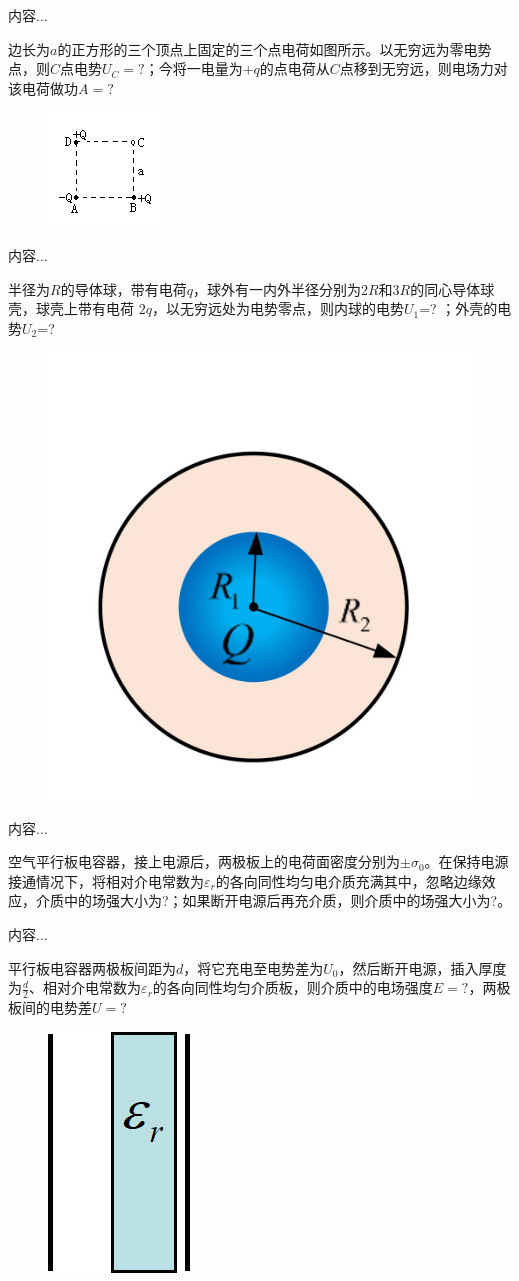 \documentclass[lang=cn,10pt]{elegantbook}
\begin{document}
		\begin{solution}
			内容...
		\end{solution}
		\begin{exercise}
			边长为$a$的正方形的三个顶点上固定的三个点电荷如图所示。以无穷远为零电势点，则$C$点电势$U_{C} =?$；今将一电量为$+q$的点电荷从$C$点移到无穷远，则电场力对该电荷做功$A=?$
\begin{figure}[H]
	\centering
	\includegraphics[width=0.1\linewidth]{image/图片4}
	\caption{}
	\label{fig:4}
\end{figure}
		\end{exercise}
		\begin{solution}
			内容...
		\end{solution}
		\begin{exercise}
			半径为$R$的导体球，带有电荷$q$，球外有一内外半径分别为$2R$和$3R$的同心导体球壳，球壳上带有电荷 $2q$，以无穷远处为电势零点，则内球的电势$U_{1}$=? ；外壳的电势$U_{2}$=?
\begin{figure}[H]
	\centering
	\includegraphics[width=0.1\linewidth]{image/IMG_0418(20231118-125659)}
	\caption{}
	\label{fig:img041820231118-125659}
\end{figure}
		\end{exercise}
		\begin{solution}
			内容...
		\end{solution}
		\begin{exercise}
			空气平行板电容器，接上电源后，两极板上的电荷面密度分别为$\pm \sigma_{0}$。在保持电源接通情况下，将相对介电常数为$\varepsilon_{r}$的各向同性均匀电介质充满其中，忽略边缘效应，介质中的场强大小为?；如果断开电源后再充介质，则介质中的场强大小为?。
		\end{exercise}
		\begin{solution}
			内容...
		\end{solution}
		\begin{exercise}
			平行板电容器两极板间距为$d$，将它充电至电势差为$U_{0}$，然后断开电源，插入厚度为$\frac{d}{2}$、相对介电常数为$\varepsilon_{r}$的各向同性均匀介质板，则介质中的电场强度$E =?$，两极板间的电势差$U =?$			
\begin{figure}[H]
	\centering
	\includegraphics[width=0.1\linewidth]{image/图片6}
	\caption{}
	\label{fig:6}
\end{figure}
		\end{exercise}
\end{document}
